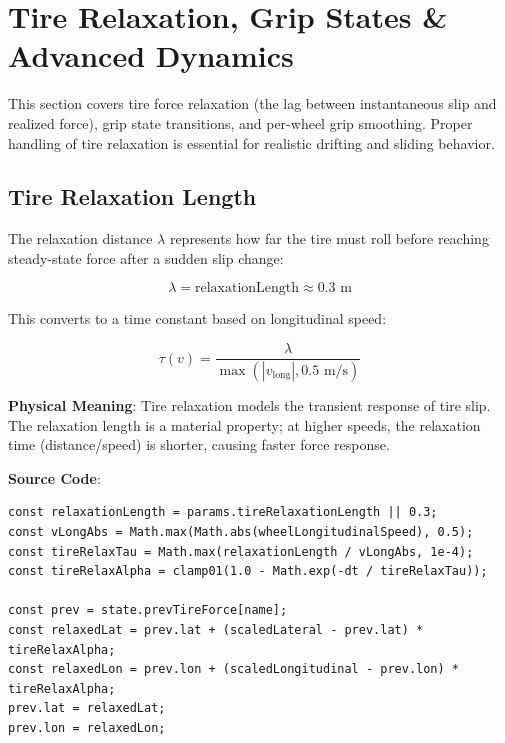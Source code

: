 \section{Tire Relaxation, Grip States \& Advanced Dynamics}

\label{sec:tire-relaxation}

This section covers tire force relaxation (the lag between instantaneous slip and realized force), grip state transitions, and per-wheel grip smoothing. Proper handling of tire relaxation is essential for realistic drifting and sliding behavior.

\subsection{Tire Relaxation Length}

The relaxation distance $\lambda$ represents how far the tire must roll before reaching steady-state force after a sudden slip change:

\begin{equation}
  \lambda = \text{relaxationLength} \approx 0.3 \text{ m}
  \label{eq:relaxation-length}
\end{equation}

This converts to a time constant based on longitudinal speed:

\begin{equation}
  \tau(v) = \frac{\lambda}{\max(|v_{\text{long}}|, 0.5 \text{ m/s})}
  \label{eq:relaxation-tau}
\end{equation}

\textbf{Physical Meaning}: Tire relaxation models the transient response of tire slip. The relaxation length is a material property; at higher speeds, the relaxation time (distance/speed) is shorter, causing faster force response.

\textbf{Source Code}: 

\begin{lstlisting}[caption={Tire force relaxation via EMA}]
const relaxationLength = params.tireRelaxationLength || 0.3;
const vLongAbs = Math.max(Math.abs(wheelLongitudinalSpeed), 0.5);
const tireRelaxTau = Math.max(relaxationLength / vLongAbs, 1e-4);
const tireRelaxAlpha = clamp01(1.0 - Math.exp(-dt / tireRelaxTau));

const prev = state.prevTireForce[name];
const relaxedLat = prev.lat + (scaledLateral - prev.lat) * tireRelaxAlpha;
const relaxedLon = prev.lon + (scaledLongitudinal - prev.lon) * tireRelaxAlpha;
prev.lat = relaxedLat;
prev.lon = relaxedLon;
\end{lstlisting}

